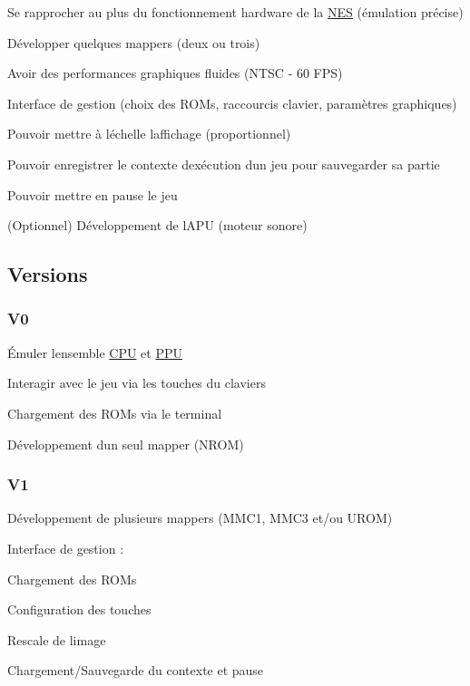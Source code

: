 \begin{DoxyItemize}
\item Se rapprocher au plus du fonctionnement hardware de la \hyperlink{struct_n_e_s}{N\+ES} (émulation précise)
\item Développer quelques mappers (deux ou trois)
\item Avoir des performances graphiques fluides (N\+T\+SC -\/ 60 F\+PS)
\item Interface de gestion (choix des R\+O\+Ms, raccourcis clavier, paramètres graphiques)
\begin{DoxyItemize}
\item Pouvoir mettre à l\textquotesingle{}échelle l\textquotesingle{}affichage (proportionnel)
\item Pouvoir enregistrer le contexte d\textquotesingle{}exécution d\textquotesingle{}un jeu pour sauvegarder sa partie
\item Pouvoir mettre en pause le jeu
\end{DoxyItemize}
\item (Optionnel) Développement de l\textquotesingle{}A\+PU (moteur sonore)
\end{DoxyItemize}

\subsection*{Versions}

\subsubsection*{V0}


\begin{DoxyItemize}
\item Émuler l\textquotesingle{}ensemble \hyperlink{struct_c_p_u}{C\+PU} et \hyperlink{struct_p_p_u}{P\+PU}
\item Interagir avec le jeu via les touches du claviers
\item Chargement des R\+O\+Ms via le terminal
\item Développement d\textquotesingle{}un seul mapper (N\+R\+OM)
\end{DoxyItemize}

\subsubsection*{V1}


\begin{DoxyItemize}
\item Développement de plusieurs mappers (M\+M\+C1, M\+M\+C3 et/ou U\+R\+OM)
\item Interface de gestion \+:
\begin{DoxyItemize}
\item Chargement des R\+O\+Ms
\item Configuration des touches
\item Rescale de l\textquotesingle{}image
\item Chargement/\+Sauvegarde du contexte et pause 
\end{DoxyItemize}
\end{DoxyItemize}